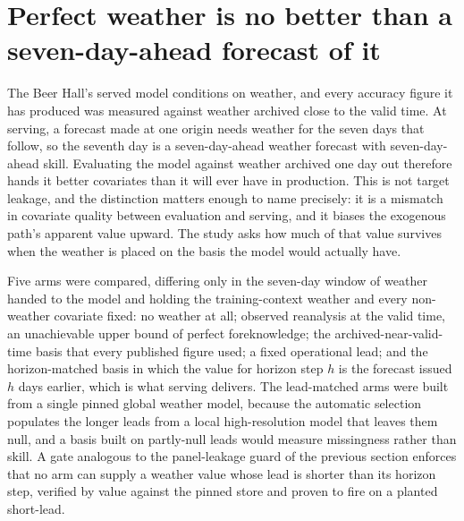 \section{Perfect weather is no better than a seven-day-ahead forecast of it}
\label{sec:weather}

The Beer Hall's served model conditions on weather, and every accuracy figure it has produced
was measured against weather archived close to the valid time. At serving, a forecast made at
one origin needs weather for the seven days that follow, so the seventh day is a seven-day-ahead
weather forecast with seven-day-ahead skill. Evaluating the model against weather archived one
day out therefore hands it better covariates than it will ever have in production. This is not
target leakage, and the distinction matters enough to name precisely: it is a mismatch in
covariate quality between evaluation and serving, and it biases the exogenous path's apparent
value upward. The study asks how much of that value survives when the weather is placed on the
basis the model would actually have.

Five arms were compared, differing only in the seven-day window of weather handed to the model
and holding the training-context weather and every non-weather covariate fixed: no weather at
all; observed reanalysis at the valid time, an unachievable upper bound of perfect foreknowledge;
the archived-near-valid-time basis that every published figure used; a fixed operational lead;
and the horizon-matched basis in which the value for horizon step $h$ is the forecast issued $h$
days earlier, which is what serving delivers. The lead-matched arms were built from a single
pinned global weather model, because the automatic selection populates the longer leads from a
local high-resolution model that leaves them null, and a basis built on partly-null leads would
measure missingness rather than skill. A gate analogous to the panel-leakage guard of the
previous section enforces that no arm can supply a weather value whose lead is shorter than its
horizon step, verified by value against the pinned store and proven to fire on a planted
short-lead.

